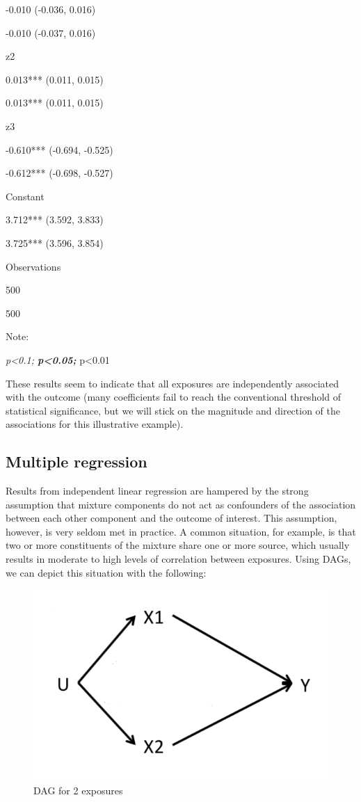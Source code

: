\documentclass[
]{book}
\begin{document}
-0.010 (-0.036, 0.016)

-0.010 (-0.037, 0.016)

z2

0.013*** (0.011, 0.015)

0.013*** (0.011, 0.015)

z3

-0.610*** (-0.694, -0.525)

-0.612*** (-0.698, -0.527)

Constant

3.712*** (3.592, 3.833)

3.725*** (3.596, 3.854)

Observations

500

500

Note:

\emph{p\textless0.1; \textbf{p\textless0.05; }}p\textless0.01

These results seem to indicate that all exposures are independently associated with the outcome (many coefficients fail to reach the conventional threshold of statistical significance, but we will stick on the magnitude and direction of the associations for this illustrative example).

\hypertarget{multiple-regression}{%
\subsection{Multiple regression}\label{multiple-regression}}

Results from independent linear regression are hampered by the strong assumption that mixture components do not act as confounders of the association between each other component and the outcome of interest. This assumption, however, is very seldom met in practice. A common situation, for example, is that two or more constituents of the mixture share one or more source, which usually results in moderate to high levels of correlation between exposures. Using DAGs, we can depict this situation with the following:

\begin{figure}
\centering
\includegraphics{images/dag2.png}
\caption{DAG for 2 exposures}
\end{figure}
\end{document}
